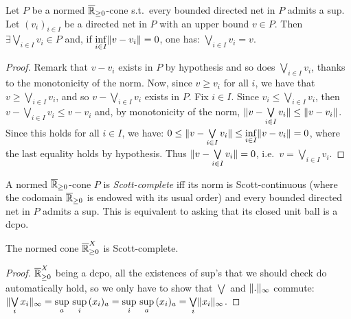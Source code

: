 \begin{proposition}\label{prop:infsup}
 Let $P$ be a normed $\overline{\mathbb{R}}_{\geq 0}$-cone s.t.\ every bounded directed net in $P$ admits a sup.
 Let $(v_i)_{i\in I}$ be a directed net in $P$ with an upper bound $v\in P$.
 Then $\exists\bigvee\limits_{i\in I} v_i \in P$ and, if $\inf\limits_{i\in I} \lVert v-v_i\rVert =0$, one has: $\bigvee\limits_{i\in I} v_i = v$.
\end{proposition}
\begin{proof}
 Remark that $v-v_i$ exists in $P$ by hypothesis and so does $\bigvee\limits_{i\in I} v_i$, thanks to the monotonicity of the norm.
 Now, since $v\geq v_i$ for all $i$, we have that $v\geq \bigvee\limits_{i\in I} v_i$, and so $v-\bigvee\limits_{i\in I} v_i$ exists in $P$.
 Fix $i\in I$.
 Since $v_i\leq \bigvee\limits_{i\in I} v_i$, then $v-\bigvee\limits_{i\in I} v_i\leq v-v_i$ and, by monotonicity of the norm, $\lVert v-\bigvee\limits_{i\in I} v_i\rVert\leq \lVert v-v_i\rVert$.
 Since this holds for all $i\in I$, we have:
 $0\leq \lVert v-\bigvee\limits_{i\in I} v_i\rVert\leq \inf\limits_{i\in I} \lVert v-v_i\rVert=0$, where the last equality holds by hypothesis.
 Thus $\lVert v-\bigvee\limits_{i\in I} v_i\rVert=0$, i.e.\ $v=\bigvee\limits_{i\in I} v_i$.
\end{proof}

\begin{definition}
 A normed $\overline{\mathbb{R}}_{\geq 0}$-cone $P$ is \emph{Scott-complete} iff its norm is Scott-continuous (where the codomain $\overline{\mathbb{R}}_{\geq 0}$ is endowed with its usual order) and every bounded directed net in $P$ admits a sup.
 This is equivalent to asking that its closed unit ball is a dcpo.
\end{definition}

\begin{proposition}
 The normed cone $\overline{\mathbb{R}}_{\geq 0}^X$ is Scott-complete.
\end{proposition}
\begin{proof}
 $\overline{\mathbb{R}}_{\geq 0}^X$ being a dcpo, all the existences of sup's that we should check do automatically hold, so we only have to show that $\bigvee$ and $\lVert.\rVert_\infty$ commute:
 $\lVert\bigvee\limits_i x_i\rVert_\infty=
 \sup\limits_a\, \sup\limits_i\, (x_i)_a =
 \sup\limits_i\, \sup\limits_a\, (x_i)_a =
 \bigvee\limits_i \lVert x_i\rVert_\infty$.
\end{proof}


